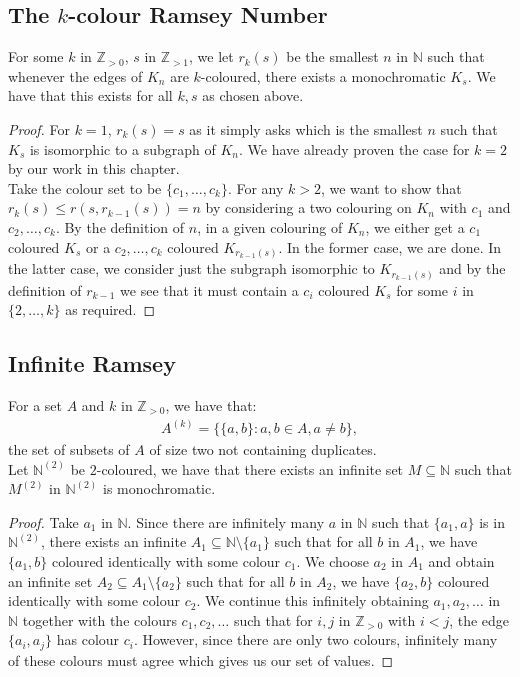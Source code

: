 \subsection{The $k$-colour Ramsey Number}

For some $k$ in $\mathbb{Z}_{> 0}$, $s$ in $\mathbb{Z}_{> 1}$, we let $r_k(s)$ 
be the smallest $n$ in $\mathbb{N}$ such that whenever the edges of $K_n$ are
$k$-coloured, there exists a monochromatic $K_s$.
We have that this exists for all $k, s$ as chosen above.
\begin{proof}
    For $k = 1$, $r_k(s) = s$ as it simply asks which is the smallest $n$ such that
    $K_s$ is isomorphic to a subgraph of $K_n$. We have already proven the case
    for $k = 2$ by our work in this chapter. 
    \\[\baselineskip]
    Take the colour set to be $\{c_1, \ldots, c_k\}$.
    For any $k > 2$, we want to show
    that $r_k(s) \leq r(s, r_{k - 1}(s)) = n$ by considering a two colouring on
    $K_n$ with $c_1$ and $c_2, \ldots, c_k$. By the definition of $n$, 
    in a given colouring of $K_n$, we either
    get a $c_1$ coloured $K_s$ or a $c_2, \ldots, c_k$ coloured $K_{r_{k - 1}(s)}$.
    In the former case, we are done. In the latter case, we consider just the subgraph
    isomorphic to $K_{r_{k - 1}(s)}$ and by the definition of $r_{k - 1}$ we see
    that it must contain a $c_i$ coloured $K_s$ for some $i$ in $\{2, \ldots, k\}$
    as required.
\end{proof}

\subsection{Infinite Ramsey}

For a set $A$ and $k$ in $\mathbb{Z}_{> 0}$,  we have that: \begin{gather*}
  A^{(k)} = \{\{a, b\} : a, b \in A, a \neq b\},
\end{gather*} the set of subsets of $A$ of size two not containing duplicates.
\\[\baselineskip]
Let $\mathbb{N}^{(2)}$ be $2$-coloured, we have that there exists an infinite set 
$M \subseteq \mathbb{N}$ such that $M^{(2)}$ in $\mathbb{N}^{(2)}$ is monochromatic.
\begin{proof}
    Take $a_1$ in $\mathbb{N}$. Since there are infinitely many $a$ in $\mathbb{N}$
    such that $\{a_1, a\}$ is in $\mathbb{N}^{(2)}$, there exists an infinite
    $A_1 \subseteq \mathbb{N}\setminus\{a_1\}$ such that for all $b$ in $A_1$, 
    we have $\{a_1, b\}$ coloured identically with some colour $c_1$. 
    We choose $a_2$ in $A_1$ and obtain an infinite set 
    $A_2 \subseteq A_1 \setminus \{a_2\}$ such that for all $b$ in $A_2$, 
    we have $\{a_2, b\}$ coloured identically with some colour $c_2$.
    We continue this infinitely obtaining $a_1, a_2, \ldots$ in $\mathbb{N}$
    together with the colours $c_1, c_2, \ldots$ such that for $i, j$ in 
    $\mathbb{Z}_{>0}$ with $i < j$, the edge $\{a_i, a_j\}$ has colour $c_i$.
    However, since there are only two colours, infinitely many of these colours
    must agree which gives us our set of values.
\end{proof}